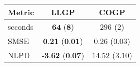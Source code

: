 \begin{tabular}{|l|cc|}\hline\abovespace\belowspace
Metric & LLGP & COGP\\
\hline\abovespace
seconds & $\textbf{64}$ ($\textbf{8}$) & $296$ ($2$)\\
SMSE & $\textbf{0.21}$ ($\textbf{0.01}$) & $0.26$ ($0.03$)\\
NLPD & $\textbf{-3.62}$ ($\textbf{0.07}$) & $14.52$ ($3.10$)
\belowspace \\
\hline
\end{tabular}
